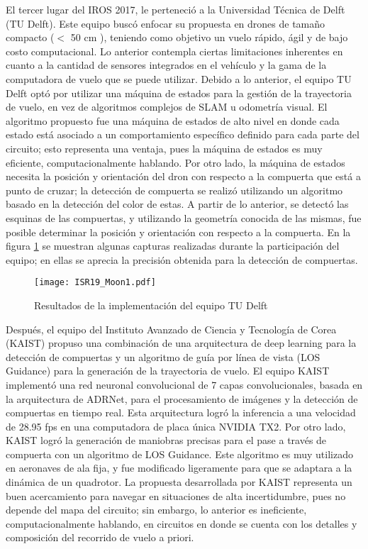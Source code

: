 El tercer lugar del IROS 2017, le perteneció a la Universidad Técnica de Delft (TU Delft). Este equipo buscó enfocar su propuesta en drones de tamaño compacto ($<$ 50 cm ), teniendo como objetivo un vuelo rápido, ágil y de bajo costo computacional. Lo anterior contempla ciertas limitaciones inherentes en cuanto a la cantidad de sensores integrados en el vehículo y la gama de la computadora de vuelo que se puede utilizar.
Debido a lo anterior, el equipo TU Delft optó por utilizar una máquina de estados para la gestión de la trayectoria de vuelo, en vez de algoritmos complejos de SLAM u odometría visual. El algoritmo propuesto fue una máquina de estados de alto nivel en donde cada estado está asociado a un comportamiento específico definido para cada parte del circuito; esto representa una ventaja, pues la máquina de estados es muy eficiente, computacionalmente hablando. 
Por otro lado, la máquina de estados necesita la posición y orientación del dron con respecto a la compuerta que está a punto de cruzar; la detección de compuerta se realizó utilizando un algoritmo basado en la detección del color de estas. A partir de lo anterior, se detectó las esquinas de las compuertas, y utilizando la geometría conocida de las mismas, fue posible determinar la posición y orientación con respecto a la compuerta. En la figura \ref{fig:ISR19_Moon1} se muestran algunas capturas realizadas durante la participación del equipo; en ellas se aprecia la precisión obtenida para la detección de compuertas.

\begin{figure}[ht]
    \centering
    \texttt{[image: ISR19\_Moon1.pdf]}
    \caption{Resultados de la implementación del equipo TU Delft \cite{moon2019challenges}}
    \label{fig:ISR19_Moon1}
\end{figure}

Después, el equipo del Instituto Avanzado de Ciencia y Tecnología de Corea (KAIST) propuso una combinación de una arquitectura de deep learning para la detección de compuertas y un algoritmo de guía por línea de vista (LOS Guidance) para la generación de la trayectoria de vuelo.
 El equipo KAIST implementó una red neuronal convolucional de 7 capas convolucionales, basada en la arquitectura de ADRNet, para el procesamiento de imágenes y la detección de compuertas en tiempo real. Esta arquitectura logró la inferencia a una velocidad de 28.95 fps en una computadora de placa única NVIDIA TX2. 
Por otro lado, KAIST logró la generación de maniobras precisas para el pase a través de compuerta con un algoritmo de LOS Guidance. Este algoritmo es muy utilizado en aeronaves de ala fija, y fue modificado ligeramente para que se adaptara a la dinámica de un quadrotor.
La propuesta desarrollada por KAIST representa un buen acercamiento para navegar en situaciones de alta incertidumbre, pues no depende del mapa del circuito; sin embargo, lo anterior es ineficiente, computacionalmente hablando, en circuitos en donde se cuenta con los detalles y composición del recorrido de vuelo a priori.

